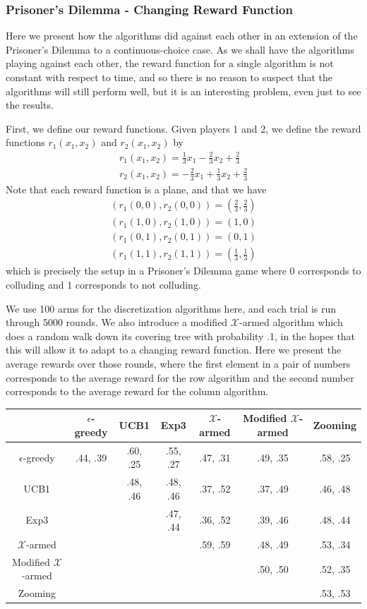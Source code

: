 \subsubsection{Prisoner's Dilemma - Changing Reward Function}
Here we present how the algorithms did against each other in an extension of
the Prisoner's Dilemma to a continuous-choice case.  As we shall have the
algorithms playing against each other, the reward function for a single
algorithm is not constant with respect to time, and so there is no reason to
suspect that the algorithms will still perform well, but it is an interesting
problem, even just to see the results.

First, we define our reward functions.  Given players 1 and 2, we define the
reward functions $r_1(x_1, x_2)$ and $r_2(x_1, x_2)$ by
\begin{gather*}
	r_1(x_1, x_2) = \frac{1}{3} x_1 - \frac{2}{3} x_2 + \frac{2}{3}\\
	r_2(x_1, x_2) = -\frac{2}{3} x_1 + \frac{1}{3} x_2 + \frac{2}{3}
\end{gather*}
Note that each reward function is a plane, and that we have
\begin{gather*}
	(r_1(0,0), r_2(0,0)) = \left(\frac{2}{3}, \frac{2}{3}\right) \\
	(r_1(1,0), r_2(1,0)) = (1, 0) \\
	(r_1(0,1), r_2(0,1)) = (0, 1) \\
	(r_1(1,1), r_2(1,1)) = \left(\frac{1}{3}, \frac{1}{3}\right)
\end{gather*}
which is precisely the setup in a Prisoner's Dilemma game where 0 corresponds
to colluding and 1 corresponds to not colluding.

We use 100 arms for the discretization algorithms here, and each trial is run
through 5000 rounds.  We also introduce a modified $\mathcal{X}$-armed
algorithm which does a random walk down its covering tree with probability .1,
in the hopes that this will allow it to adapt to a changing reward function.
Here we present the average rewards over those rounds, where the first element
in a pair of numbers corresponds to the average reward for the row algorithm
and the second number corresponds to the average reward for the column
algorithm.  

\begin{tabular}{|c|c|c|c|c|c|c|}
\hline
& $\epsilon$-greedy & UCB1 & Exp3 & $\mathcal{X}$-armed &
Modified $\mathcal{X}$-armed & Zooming \\ \hline
$\epsilon$-greedy & .44, .39 & .60, .25 & .55, .27 & .47, .31 & .49, .35 &
.58, .25\\ \hline
UCB1 & & .48, .46 & .48, .46 & .37, .52 & .37, .49  & .46, .48 \\ \hline
Exp3 & & & .47, .44 & .36, .52 & .39, .46 & .48, .44 \\ \hline
$\mathcal{X}$-armed & & & & .59, .59 & .48, .49 & .53, .34 \\ \hline
Modified $\mathcal{X}$-armed & & & & & .50, .50 & .52, .35 \\ \hline
Zooming & & & & & & .53, .53 \\ \hline
\end{tabular}

